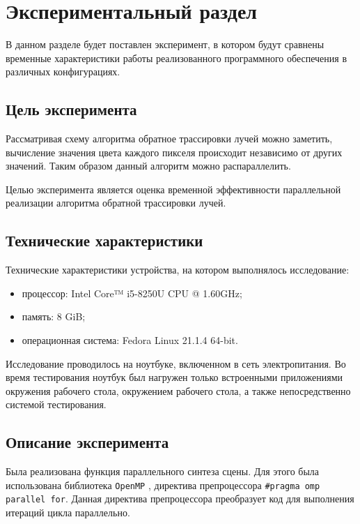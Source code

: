 \chapter{Экспериментальный раздел}

    В данном разделе будет поставлен эксперимент, в котором будут сравнены временные характеристики работы реализованного программного обеспечения в различных конфигурациях.
    
    \section{Цель эксперимента}
    
        Рассматривая схему алгоритма обратное трассировки лучей можно заметить, вычисление значения цвета каждого пикселя происходит независимо от других значений. Таким образом данный алгоритм можно распараллелить.

        Целью эксперимента является оценка временной эффективности параллельной реализации алгоритма обратной трассировки лучей.
    
    \section{Технические характеристики}

        Технические характеристики устройства, на котором выполнялось исследование:

        \begin{itemize}
        	\item процессор: Intel Core™ i5-8250U \cite{i5} CPU @ 1.60GHz;
        	\item память: 8 GiB;
        	\item операционная система: Fedora \cite{fedora} Linux \cite{linux} 21.1.4 64-bit.
        \end{itemize}
        
        Исследование проводилось на ноутбуке, включенном в сеть электропитания. Во время тестирования ноутбук был нагружен только встроенными приложениями окружения рабочего стола, окружением рабочего стола, а также непосредственно системой тестирования.
        
    \section{Описание эксперимента}

        Была реализована функция параллельного синтеза сцены. Для этого была использована библиотека \texttt{OpenMP} \cite{omp}, директива препроцессора \texttt{\#pragma omp parallel for}. Данная директива препроцессора преобразует код для выполнения итераций цикла параллельно. 

